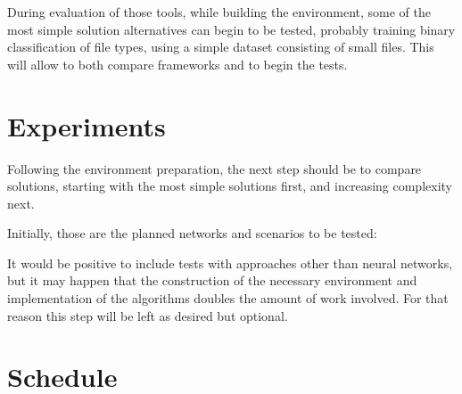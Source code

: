 During evaluation of those tools, while building the environment, some of the most simple solution alternatives can begin to be tested, probably training binary classification of file types, using a simple dataset consisting of small files. This will allow to both compare frameworks and to begin the tests.

\section{Experiments}
Following the environment preparation, the next step should be to compare solutions, starting with the most simple solutions first, and increasing complexity next.

Initially, those are the planned networks and scenarios to be tested:

It would be positive to include tests with approaches other than neural networks, but it may happen that the construction of the necessary environment and implementation of the algorithms doubles the amount of work involved. For that reason this step will be left as desired but optional.

\section{Schedule}
